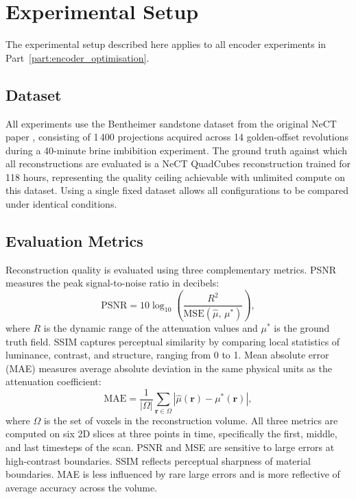 \documentclass[12pt, a4paper, twoside]{report}
\newcommand{\muhat}{\hat{\mu}}
\begin{document}
\section{Experimental Setup}
\label{sec:enc_shared_setup}

The experimental setup described here applies to all encoder experiments in Part~\ref{part:encoder_optimisation}.

\subsection*{Dataset}

All experiments use the Bentheimer sandstone dataset from the original NeCT paper \citep{friis2025nect}, consisting of 1\,400 projections acquired across 14 golden-offset revolutions during a 40-minute brine imbibition experiment. The ground truth against which all reconstructions are evaluated is a NeCT QuadCubes reconstruction trained for 118 hours, representing the quality ceiling achievable with unlimited compute on this dataset. Using a single fixed dataset allows all configurations to be compared under identical conditions.

\subsection*{Evaluation Metrics}

Reconstruction quality is evaluated using three complementary metrics. PSNR measures the peak signal-to-noise ratio in decibels:
%
\begin{equation}
    \mathrm{PSNR} = 10 \log_{10}\!\left(\frac{R^2}{\mathrm{MSE}(\hat{\mu},\, \mu^*)}\right),
    \label{eq:psnr_enc}
\end{equation}
%
where $R$ is the dynamic range of the attenuation values and $\mu^*$ is the ground truth field. SSIM \citep{wang2004ssim} captures perceptual similarity by comparing local statistics of luminance, contrast, and structure, ranging from 0 to 1. Mean absolute error (MAE) measures average absolute deviation in the same physical units as the attenuation coefficient:
%
\begin{equation}
    \mathrm{MAE} = \frac{1}{|\Omega|}\sum_{\mathbf{r} \in \Omega} \left|\muhat(\mathbf{r}) - \mu^*(\mathbf{r})\right|,
    \label{eq:mae_enc}
\end{equation}
%
where $\Omega$ is the set of voxels in the reconstruction volume. All three metrics are computed on six 2D slices at three points in time, specifically the first, middle, and last timesteps of the scan. PSNR and MSE are sensitive to large errors at high-contrast boundaries. SSIM reflects perceptual sharpness of material boundaries. MAE is less influenced by rare large errors and is more reflective of average accuracy across the volume.
\end{document}
